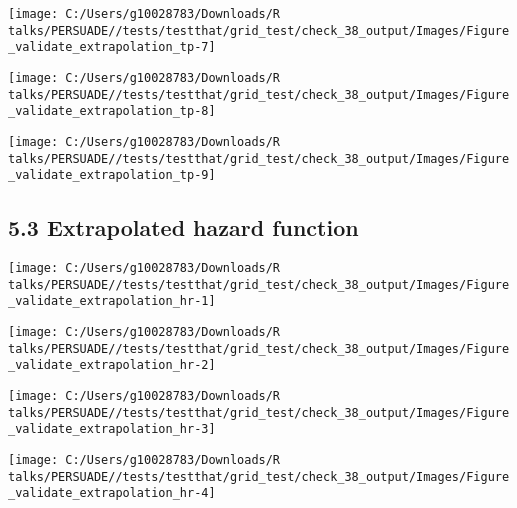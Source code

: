 \documentclass[
]{article}
\begin{document}
\begin{flushleft}\texttt{[image: C:/Users/g10028783/Downloads/R talks/PERSUADE//tests/testthat/grid\_test/check\_38\_output/Images/Figure\_validate\_extrapolation\_tp-7]} \end{flushleft}

\begin{flushleft}\texttt{[image: C:/Users/g10028783/Downloads/R talks/PERSUADE//tests/testthat/grid\_test/check\_38\_output/Images/Figure\_validate\_extrapolation\_tp-8]} \end{flushleft}

\begin{flushleft}\texttt{[image: C:/Users/g10028783/Downloads/R talks/PERSUADE//tests/testthat/grid\_test/check\_38\_output/Images/Figure\_validate\_extrapolation\_tp-9]} \end{flushleft}

\clearpage

\subsection{5.3 Extrapolated hazard
function}\label{extrapolated-hazard-function}

\begin{flushleft}\texttt{[image: C:/Users/g10028783/Downloads/R talks/PERSUADE//tests/testthat/grid\_test/check\_38\_output/Images/Figure\_validate\_extrapolation\_hr-1]} \end{flushleft}

\begin{flushleft}\texttt{[image: C:/Users/g10028783/Downloads/R talks/PERSUADE//tests/testthat/grid\_test/check\_38\_output/Images/Figure\_validate\_extrapolation\_hr-2]} \end{flushleft}

\begin{flushleft}\texttt{[image: C:/Users/g10028783/Downloads/R talks/PERSUADE//tests/testthat/grid\_test/check\_38\_output/Images/Figure\_validate\_extrapolation\_hr-3]} \end{flushleft}

\begin{flushleft}\texttt{[image: C:/Users/g10028783/Downloads/R talks/PERSUADE//tests/testthat/grid\_test/check\_38\_output/Images/Figure\_validate\_extrapolation\_hr-4]} \end{flushleft}
\end{document}
